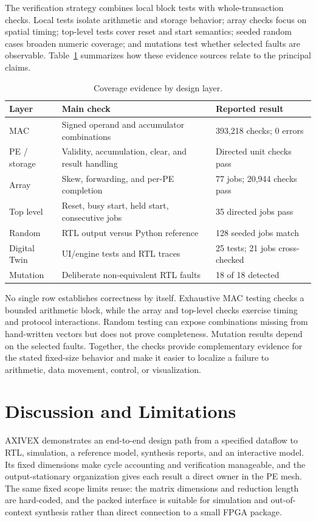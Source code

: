\documentclass[conference]{IEEEtran}
\begin{document}
The verification strategy combines local block tests with whole-transaction checks. Local tests isolate arithmetic
and storage behavior; array checks focus on spatial timing; top-level tests cover reset and start semantics; seeded
random cases broaden numeric coverage; and mutations test whether selected faults are observable. Table~\ref{tab:coverage}
summarizes how these evidence sources relate to the principal claims.

\begin{table}[t]\centering\small
\caption{Coverage evidence by design layer.}\label{tab:coverage}
\begin{tabular}{@{}p{.84in}p{1.14in}p{1.18in}@{}}\toprule
Layer & Main check & Reported result\\\midrule
MAC & Signed operand and accumulator combinations & 393,218 checks; 0 errors\\
PE / storage & Validity, accumulation, clear, and result handling & Directed unit checks pass\\
Array & Skew, forwarding, and per-PE completion & 77 jobs; 20,944 checks pass\\
Top level & Reset, busy start, held start, consecutive jobs & 35 directed jobs pass\\
Random & RTL output versus Python reference & 128 seeded jobs match\\
Digital Twin & UI/engine tests and RTL traces & 25 tests; 21 jobs cross-checked\\
Mutation & Deliberate non-equivalent RTL faults & 18 of 18 detected\\\bottomrule
\end{tabular}\end{table}

No single row establishes correctness by itself. Exhaustive MAC testing checks a bounded arithmetic block, while the
array and top-level checks exercise timing and protocol interactions. Random testing can expose combinations missing
from hand-written vectors but does not prove completeness. Mutation results depend on the selected faults. Together,
the checks provide complementary evidence for the stated fixed-size behavior and make it easier to localize a failure
to arithmetic, data movement, control, or visualization.

\section{Discussion and Limitations}
AXIVEX demonstrates an end-to-end design path from a specified dataflow to RTL, simulation, a reference model, synthesis
reports, and an interactive model. Its fixed dimensions make cycle accounting and verification manageable, and the
output-stationary organization gives each result a direct owner in the PE mesh. The same fixed scope limits reuse: the
matrix dimensions and reduction length are hard-coded, and the packed interface is suitable for simulation and
out-of-context synthesis rather than direct connection to a small FPGA package.
\end{document}
